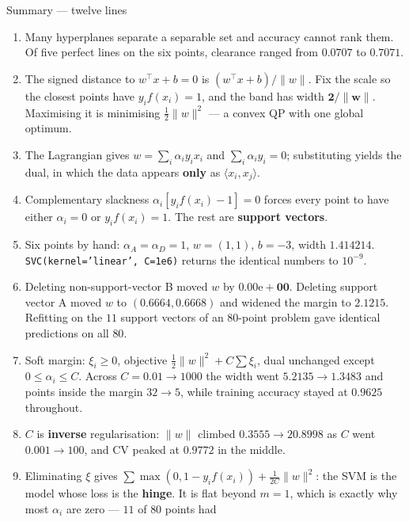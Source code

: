 \documentclass[aspectratio=169]{beamer}
\begin{document}
\begin{frame}[shrink=24]{Summary --- twelve lines}
  \begin{enumerate}\small
    \item Many hyperplanes separate a separable set and accuracy cannot rank
      them. Of five perfect lines on the six points, clearance ranged from
      $0.0707$ to $\mathbf{0.7071}$.
    \item The signed distance to $w^\top x + b = 0$ is $(w^\top x+b)/\|w\|$.
      Fix the scale so the closest points have $y_i f(x_i) = 1$, and the band
      has width $\mathbf{2/\|w\|}$. Maximising it is minimising
      $\tfrac12\|w\|^2$ --- a convex QP with one global optimum.
    \item The Lagrangian gives $w = \sum_i \alpha_i y_i x_i$ and
      $\sum_i \alpha_i y_i = 0$; substituting yields the dual, in which the
      data appears \textbf{only} as $\langle x_i, x_j\rangle$.
    \item Complementary slackness
      $\alpha_i[y_i f(x_i) - 1] = 0$ forces every point to have either
      $\alpha_i = 0$ or $y_i f(x_i) = 1$. The rest are
      \textbf{support vectors}.
    \item Six points by hand: $\alpha_A = \alpha_D = 1$, $w = (1,1)$,
      $b = -3$, width $\mathbf{1.414214}$. \texttt{SVC(kernel='linear',
      C=1e6)} returns the identical numbers to $10^{-9}$.
    \item Deleting non-support-vector B moved $w$ by
      $\mathbf{0.00\mathrm{e}{+}00}$. Deleting support vector A moved
      $w$ to $(0.6664, 0.6668)$ and widened the margin to $2.1215$.
      Refitting on the $11$ support vectors of an $80$-point problem gave
      identical predictions on all $80$.
    \item Soft margin: $\xi_i \ge 0$, objective
      $\tfrac12\|w\|^2 + C\sum\xi_i$, dual unchanged except
      $0 \le \alpha_i \le C$. Across $C = 0.01 \to 1000$ the width went
      $5.2135 \to 1.3483$ and points inside the margin $32 \to 5$, while
      training accuracy stayed at $0.9625$ throughout.
    \item $C$ is \textbf{inverse} regularisation: $\|w\|$ climbed
      $0.3555 \to 20.8998$ as $C$ went $0.001 \to 100$, and CV peaked at
      $\mathbf{0.9772}$ in the middle.
    \item Eliminating $\xi$ gives
      $\sum \max(0, 1 - y_i f(x_i)) + \frac{1}{2C}\|w\|^2$: the SVM is the
      model whose loss is the \textbf{hinge}. It is flat beyond $m=1$, which
      is exactly why most $\alpha_i$ are zero --- $11$ of $80$ points had

\end{enumerate}
\end{frame}
\end{document}
